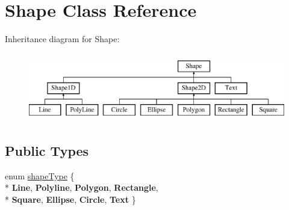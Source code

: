 \hypertarget{classShape}{\section{Shape Class Reference}
\label{classShape}
}
Inheritance diagram for Shape\-:\begin{figure}[H]
\begin{center}
\leavevmode
\includegraphics[height=3.000000cm]{classShape}
\end{center}
\end{figure}
\subsection*{Public Types}
\begin{DoxyCompactItemize}
\item 
enum \hyperlink{classShape_aaac58aa2f6760d0f06ec1710d5123e9b}{shape\-Type} \{ \\*
{\bfseries Line}, 
{\bfseries Polyline}, 
{\bfseries Polygon}, 
{\bfseries Rectangle}, 
\\*
{\bfseries Square}, 
{\bfseries Ellipse}, 
{\bfseries Circle}, 
{\bfseries Text}
 \}
\end{DoxyCompactItemize}
